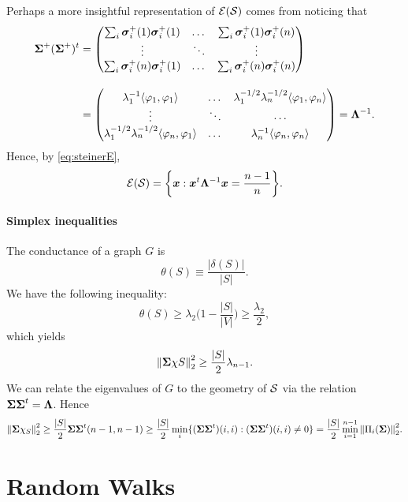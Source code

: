 Perhaps a more insightful representation of $\mathcal{E}(\mathcal{S})$ comes from noticing that 
\begin{align*}
    \boldsymbol{\Sigma}^+(\boldsymbol{\Sigma}^+)^t &= 
    \begin{pmatrix}
\sum_i \vb*{\sigma}_i^+(1)\vb*{\sigma}_i^+(1) & \dots & \sum_i \vb*{\sigma}_i^+(1)\vb*{\sigma}_i^+(n) \\
\vdots &\ddots  & \vdots \\
\sum_i \vb*{\sigma}_i^+(n)\vb*{\sigma}_i^+(1) & \dots & \sum_i \vb*{\sigma}_i^+(n)\vb*{\sigma}_i^+(n)
\end{pmatrix}
\\[10pt]
&= 
\begin{pmatrix}
\lambda_1^{-1} \langle \varphi_1,\varphi_1\rangle & \dots & \lambda_1^{-1/2}\lambda_n^{-1/2}\langle \varphi_1,\varphi_n\rangle \\
\vdots & \ddots & \cdots \\
\lambda_1^{-1/2}\lambda_n^{-1/2}\langle \varphi_n,\varphi_1\rangle & \dots &\lambda_n^{-1} \langle \varphi_n,\varphi_n\rangle 
\end{pmatrix} = \vb{\Lambda}^{-1}.
\end{align*}
Hence, by \eqref{eq:steinerE},
\begin{equation}
\label{eq:steinerE2}
    \mathcal{E}(\mathcal{S}) = \bigg\{\vb*{x}:\vb*{x}^t \vb{\Lambda}^{-1}\vb*{x} = \frac{n-1}{n}\bigg\}.
\end{equation}


\paragraph{Simplex inequalities}
The conductance of a graph $G$ is 
\begin{equation*}
    \theta(S) \equiv \frac{|\delta(S)|}{|S|}. 
\end{equation*}
We have the following inequality: 
\[\theta(S)\geq \lambda_2\bigg(1-\frac{|S|}{|V|}\bigg)\geq \frac{\lambda_2}{2},\]
which yields 
\[\norm{\boldsymbol{\Sigma} \chi S}_2^2 \geq \frac{|S|}{2}\lambda_{n-1}.\]
We can relate the eigenvalues of $G$ to the geometry of $\mathcal{S}$ via the relation $\boldsymbol{\Sigma}\boldsymbol{\Sigma}^t = \vb{\Lambda}$. Hence
\[\norm{\boldsymbol{\Sigma} \chi_S}_2^2 \geq \frac{|S|}{2} \boldsymbol{\Sigma}\boldsymbol{\Sigma}^t (n-1,n-1)\geq \frac{|S|}{2} \min_{i}\{(\boldsymbol{\Sigma}\boldsymbol{\Sigma}^t)(i,i):(\boldsymbol{\Sigma}\boldsymbol{\Sigma}^t)(i,i)\neq 0\} = \frac{|S|}{2}\min_{i=1}^{n-1} \norm{\Pi_i(\boldsymbol{\Sigma})}_2^2.  \]





\section{Random Walks}


